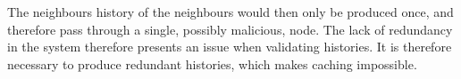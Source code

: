 	The neighbours history of the neighbours would then only be produced once, and therefore pass through a single, possibly malicious, node. The lack of redundancy in the system therefore presents an issue when validating histories.
	It is therefore necessary to produce redundant histories, which makes caching impossible.